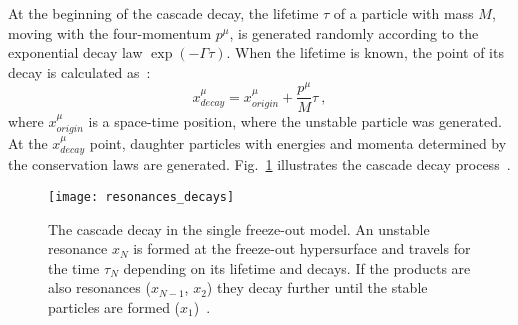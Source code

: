       At the beginning of the cascade decay, the lifetime $\tau$ of a particle with mass $M$, moving with the four-momentum $p^\mu$, is generated randomly according to the exponential decay law $\exp(-\Gamma\tau)$.
      When the lifetime is known, the point of its decay is calculated as~\cite{therminator}:
      \begin{equation}
        x^\mu_{decay} = x^\mu_{origin} + \frac{p^\mu}{M}\tau~,
      \end{equation}
      where $x^\mu_{origin}$ is a space-time position, where the unstable particle was generated.
      At the $x^\mu_{decay}$ point, daughter particles with energies and momenta determined by the conservation laws are generated.
      Fig.~\ref{fig:resonances-decay} illustrates the cascade decay process~\cite{therminator}.
      \begin{figure}[h]
        \centering
        \texttt{[image: resonances\_decays]}
        \caption{The cascade decay in the single freeze-out model. An unstable resonance $x_N$ is formed at the freeze-out hypersurface and travels for the time $\tau_N$ depending on its lifetime and decays. If the products are also resonances ($x_{N-1}$, $x_2$) they decay further until the stable particles are formed ($x_1$)~\cite{therminator}.}
        \label{fig:resonances-decay}
      \end{figure}
